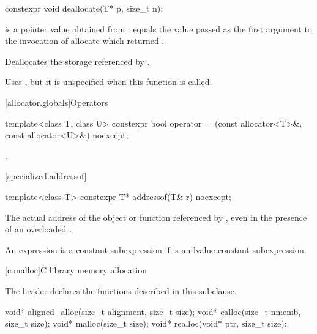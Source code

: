 %
\begin{itemdecl}
constexpr void deallocate(T* p, size_t n);
\end{itemdecl}

\begin{itemdescr}
\pnum
\expects
{} is a pointer value obtained from .
 equals the value passed as the first argument
to the invocation of allocate which returned .

\pnum
\effects
Deallocates the storage referenced by  .

\pnum
\remarks
Uses
,
but it is unspecified
when this function is called.
\end{itemdescr}

[allocator.globals]{Operators}

%
\begin{itemdecl}
template<class T, class U>
  constexpr bool operator==(const allocator<T>&, const allocator<U>&) noexcept;
\end{itemdecl}

\begin{itemdescr}
\pnum
\returns
{}.
\end{itemdescr}

[specialized.addressof]{}

%
\begin{itemdecl}
template<class T> constexpr T* addressof(T& r) noexcept;
\end{itemdecl}

\begin{itemdescr}
\pnum
\returns
The actual address of the object or function referenced by , even in the
presence of an overloaded .

\pnum
\remarks
An expression 
is a constant subexpression
if  is an lvalue constant subexpression.
\end{itemdescr}

[c.malloc]{C library memory allocation}

\pnum
\begin{note}
The header 
declares the functions described in this subclause.
\end{note}

%
%
%
%
\begin{itemdecl}
void* aligned_alloc(size_t alignment, size_t size);
void* calloc(size_t nmemb, size_t size);
void* malloc(size_t size);
void* realloc(void* ptr, size_t size);
\end{itemdecl}

